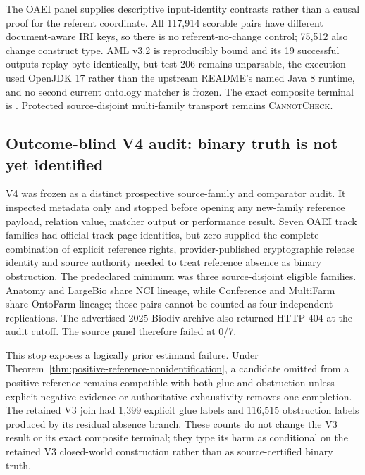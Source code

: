 The OAEI panel supplies descriptive input-identity contrasts rather than a
causal proof for the referent coordinate. All 117,914 scorable pairs have
different document-aware IRI keys, so there is no referent-no-change control;
75,512 also change construct type. AML v3.2 is reproducibly bound and its 19
successful outputs replay byte-identically, but test 206 remains unparsable,
the execution used OpenJDK 17 rather than the upstream README's named Java 8
runtime, and no second current ontology matcher is frozen. The exact composite
terminal is
.
Protected source-disjoint multi-family transport remains \textsc{CannotCheck}.

\subsection{Outcome-blind V4 audit: binary truth is not yet identified}

V4 was frozen as a distinct prospective source-family and comparator audit.
It inspected metadata only and stopped before opening any new-family reference
payload, relation value, matcher output or performance result. Seven OAEI track
families had official track-page identities, but zero supplied the complete
combination of explicit reference rights, provider-published cryptographic
release identity and source authority needed to treat reference absence as
binary obstruction. The predeclared minimum was three source-disjoint eligible
families. Anatomy and LargeBio share NCI lineage, while Conference and
MultiFarm share OntoFarm lineage; those pairs cannot be counted as four
independent replications. The advertised 2025 Biodiv archive also returned
HTTP 404 at the audit cutoff. The source panel therefore failed at 0/7.

This stop exposes a logically prior estimand failure. Under
Theorem~\ref{thm:positive-reference-nonidentification}, a candidate omitted
from a positive reference remains compatible with both glue and obstruction
unless explicit negative evidence or authoritative exhaustivity removes one
completion. The retained V3 join had 1,399 explicit glue labels and 116,515
obstruction labels produced by its residual absence branch. These counts do
not change the V3 result or its exact composite terminal; they type its harm as
conditional on the retained V3 closed-world construction rather than as
source-certified binary truth.

